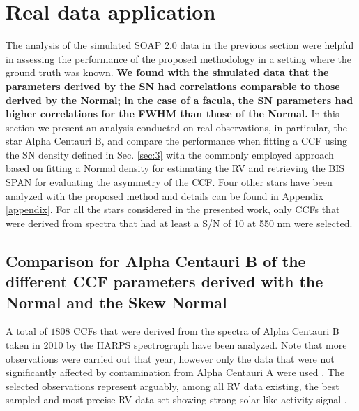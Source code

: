 \documentclass{aa}
\begin{document}
\section{Real data application} \label{sec:4}

The analysis of the simulated SOAP 2.0 data in the previous section were helpful in assessing the performance of the proposed methodology in a setting where the ground truth was known. {\bf We found with the simulated data that the parameters derived by the SN had correlations comparable to those derived by the Normal; in the case of a facula, the SN parameters had higher correlations for the FWHM than those of the Normal.} In this section we present an analysis conducted on real observations, in particular, the star Alpha Centauri B, and compare the performance when fitting a CCF using the SN density defined in Sec. \ref{sec:3} with the commonly employed approach based on fitting a Normal density for estimating the RV and retrieving the BIS SPAN for evaluating the asymmetry of the CCF. 
Four other stars have been analyzed with the proposed method and details can be found in Appendix \ref{appendix}. 
For all the stars considered in the presented work, only CCFs that were derived from spectra that had at least a S/N of 10 at 550 nm were selected. 


\subsection{Comparison for Alpha Centauri B of the different CCF parameters derived with the Normal and the Skew Normal} \label{sec:alphacentb}

A total of $1808$ CCFs that were derived from the spectra of Alpha Centauri B taken in 2010 by the HARPS spectrograph have been analyzed. Note that more observations were carried out that year, however only the data that were not significantly affected by contamination from Alpha Centauri A were used \citep[see][]{Dumusque-2012}. 
The selected observations represent arguably, among all RV data existing, the best sampled and most precise RV data set showing strong solar-like activity signal \citep{Dumusque:2018aa, Thompson-2017}.
\end{document}

